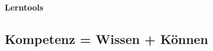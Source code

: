 \documentclass[a4paper,12pt,fleqn,parskip=half]{scrartcl}
\title{\thema}
\author{\name}
\date{\today}
\newcommand{\thema}{Lerntools}%
\begin{document}


	\begin{center}
		\textbf{\Large \thema}\\%
		\vspace{0.6em}
	\end{center}


\subsection*{Kompetenz = Wissen + Können}%
\end{document}
